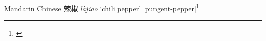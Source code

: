 \begin{etymology}\label{ety:lajiao}
Mandarin Chinese {辣椒} \textit{làjiāo} `chili pepper' [pungent-pepper]\footnote{\textcite{defrancis_abc_2003}}
\end{etymology}